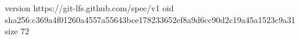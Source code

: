 version https://git-lfs.github.com/spec/v1
oid sha256:c369a4f01260a4557a55643bce178233652ef8a9d6cc90d2c19a45a1523c9a31
size 72
